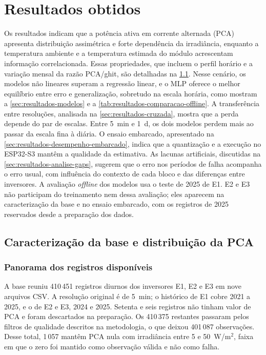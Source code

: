 \chapter{Resultados obtidos}
\label{cap:resultados}

Os resultados indicam que a potência ativa em corrente alternada (PCA)
apresenta distribuição assimétrica e forte dependência da irradiância,
enquanto a temperatura ambiente e a temperatura estimada do módulo
acrescentam informação correlacionada. Essas propriedades, que incluem o
perfil horário e a variação mensal da razão PCA/ghit, são detalhadas na
\cref{sec:resultados-distribuicao}. Nesse cenário, os modelos não lineares
superam a regressão linear, e o MLP oferece o melhor equilíbrio entre erro
e generalização, sobretudo na escala horária, como mostram a
\cref{sec:resultados-modelos} e a \cref{tab:resultados-comparacao-offline}.
A transferência entre resoluções, analisada na
\cref{sec:resultados-cruzada}, mostra que a perda depende do par de escalas.
Entre 5~min e 1~d, os dois modelos perdem mais ao passar da escala fina à
diária. O ensaio embarcado, apresentado na
\cref{sec:resultados-desempenho-embarcado}, indica que a quantização e a
execução no ESP32-S3 mantêm a qualidade da estimativa. As lacunas
artificiais, discutidas na \cref{sec:resultados-analise-gaps}, sugerem que
o erro nos períodos de falha acompanha o erro usual, com influência do
contexto de cada bloco e das diferenças entre inversores. A avaliação
\textit{offline} dos modelos usa o teste de 2025 de E1. E2 e E3 não
participam do treinamento nem dessa avaliação; eles aparecem na
caracterização da base e no ensaio embarcado, com os registros de 2025
reservados desde a preparação dos dados.

\section{Caracterização da base e distribuição da PCA}
\label{sec:resultados-distribuicao}

\subsection{Panorama dos registros disponíveis}
\label{sec:resultados-panorama-base}

A base reuniu 410\,451 registros diurnos dos inversores E1, E2 e E3 em
nove arquivos CSV. A resolução original é de 5~min; o histórico de E1
cobre 2021 a 2025, e o de E2 e E3, 2024 e 2025. Setenta e seis registros
não tinham valor de PCA e foram descartados na preparação. Os 410\,375
restantes passaram pelos filtros de qualidade descritos na metodologia,
o que deixou 401\,087 observações. Desse total, 1\,057 mantêm PCA nula
com irradiância entre 5 e 50~W/m$^2$, faixa em que o zero foi mantido
como observação válida e não como falha.

